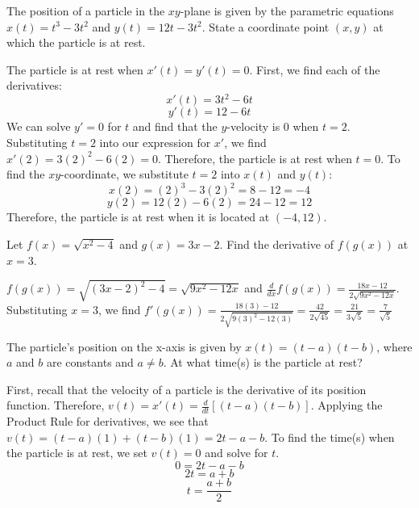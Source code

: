 \begin{Exercise} The position 
	of a particle in the $xy$-plane is given by the parametric equations 
	$x(t) = t^3-3t^2$ and $y(t) = 12t-3t^2$. State a coordinate point 
	$(x,y)$ at which the particle is at rest. 
\end{Exercise}
	
\begin{Answer}[ref=deriv_rules3]
	The particle is at rest when $x'(t) = y'(t) = 0$. First, we find each
	of the derivatives:\\
	$$x'(t) = 3t^2 - 6t$$
	$$y'(t) = 12 - 6t$$
	We can solve $y' = 0$ for $t$ and find that the $y$-velocity is $0$ 
	when $t=2$. Substituting $t=2$ into our expression for $x'$, we find 
	$x'(2) = 3(2)^2 - 6(2) = 0$. Therefore, the particle is at rest when 
	$t=0$. To find the $xy$-coordinate, we substitute $t=2$ into $x(t)$ 
	and $y(t)$:\\
	$$x(2) = (2)^3 - 3(2)^2 = 8 - 12 = -4$$
	$$y(2) = 12(2) - 6(2) = 24 - 12 = 12$$
	Therefore, the particle is at rest when it is located at $(-4, 12)$. 
\end{Answer}

\begin{Exercise}
    [label=deriv_rules4]
    Let $f(x) = \sqrt{x^2-4}$ and $g(x) = 3x-2$. Find the derivative 
    of $f(g(x))$ at $x=3$.
\end{Exercise}
\begin{Answer}
    [ref=deriv_rules4]
    $f(g(x)) = \sqrt{(3x - 2)^2 - 4} = \sqrt{9x^2 - 12x}$ and 
    $\frac{d}{dx}f(g(x)) = \frac{18x - 12}{2\sqrt{9x^2 - 12x}}$. 
    Substituting $x = 3$, we find $f'(g(x)) = \frac{18(3) - 12}{2
    \sqrt{9(3)^2 - 12(3)}} = \frac{42}{2\sqrt{45}} = 
    \frac{21}{3\sqrt{5}} = \frac{7}{\sqrt{5}}$
\end{Answer}

\begin{Exercise}
    [label=deriv_rules5]
    The particle's position on the x-axis is given by $x(t) = 
    (t - a)(t - b)$, where $a$ and $b$ are constants and $a \neq b$. 
    At what time(s) is the particle at rest?
\end{Exercise}
\begin{Answer}
    [ref=deriv_rules5]
    First, recall that the velocity of a particle is the derivative of 
    its position function. Therefore, $v(t) = x'(t) = 
    \frac{d}{dt}[(t - a)(t - b)]$. Applying the Product Rule for 
    derivatives, we see that $v(t) = (t - a)(1) + (t - b)(1) = 2t - a 
    - b$. To find the time(s) when the particle is at rest, we set 
    $v(t) = 0$ and solve for $t$. 
    $$0 = 2t - a - b$$ 
    $$2t = a + b$$ 
    $$t = \frac{a + b}{2}$$
\end{Answer}

